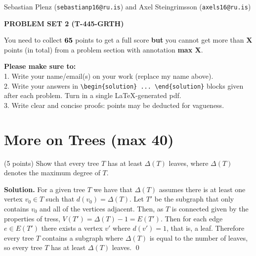 \documentclass[a4paper,11pt]{amsart}
\newcounter{temp}
\newcounter{prob_counter}
\newenvironment{problem}
{\begin{list}{{\bf \arabic{prob_counter}}}{
      \usecounter{prob_counter}
      \addtolength{\labelsep}{.6ex}
      \addtolength{\itemsep}{4.3ex}
      \setlength{\leftmargin}{1.4em}}
      \setcounter{prob_counter}{\value{temp}}
}
{\setcounter{temp}{\value{prob_counter}}  
  \end{list}
}
\newenvironment{solution}{\textbf{Solution.}}{\qed}
\newcommand{\rubrik}[1]{\bigskip \begin{center}{\bf #1}\end{center} \medskip}
\begin{document}
\pagestyle{empty}
\thispagestyle{empty}

{\small{\sc\noindent
        Sebastian Plenz ({\tt sebastianp16@ru.is})  and Axel Steingrimsson ({\tt axels16@ru.is})
}}

\rubrik{PROBLEM SET 2 (T-445-GRTH)}

You need to collect $\bf 65$ points to get a full score {\bf but} you cannot get more than {\bf X} points (in total) from a problem section with annotation {\bf max X}.

{\bf Please make sure to:}\\
1. Write your name/email(s) on your work (replace my name above).\\
2. Write your answers in \texttt{{\textbackslash}begin\{solution\} ... {\textbackslash}end\{solution\}} blocks given after each problem. Turn in a single \LaTeX-generated pdf.\\
3. Write clear and concise proofs: points may be deducted for vagueness.




\section{More on Trees ({\bf max 40}) }

\begin{problem}
\item (5 points) Show that every tree $T$ has at least $\Delta(T)$ leaves, where $\Delta(T)$ denotes the maximum degree of $T$.
\end{problem}
\begin{solution}
	For a given tree $T$ we have that $\Delta(T)$ assumes there is at least one vertex $v_0 \in T$ such that $d(v_0) = \Delta(T)$. 
	Let $T'$ be the subgraph that only contains $v_0$ and all of the vertices adjacent.
	Then, as $T$ is connected given by the properties of tress, $V(T') = \Delta(T) - 1 = E(T')$. 
	Then for each edge $e \in E(T')$ there exists a vertex $v'$ where $d(v') = 1$, that is, a leaf. 
	Therefore every tree $T$ contains a subgraph where $\Delta(T)$ is equal to the number of leaves, so every tree $T$ has at least $\Delta(T)$ leaves. 
\end{solution}
\end{document}

